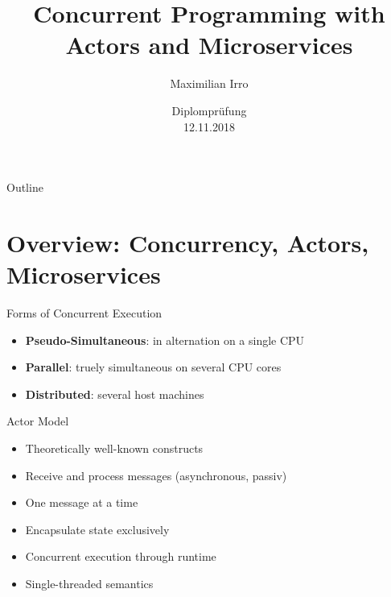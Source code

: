 \documentclass{beamer}
\title[Your Short Title]{Concurrent Programming with\\Actors and Microservices}
\author{Maximilian Irro}
\date{Diplomprüfung\\12.11.2018}
\begin{document}
\begin{frame}
  \titlepage
\end{frame}

\begin{frame}{Outline}
  \tableofcontents
\end{frame}


\section{Overview: Concurrency, Actors, Microservices}


\begin{frame}{Forms of Concurrent Execution}

\begin{itemize}
  \item \textbf{Pseudo-Simultaneous}: in alternation on a single CPU
  \item \textbf{Parallel}: truely simultaneous on several CPU cores
  \item \textbf{Distributed}: several host machines
\end{itemize}

\end{frame}


\begin{frame}{Actor Model}

\begin{itemize}
  \item Theoretically well-known constructs
  \item Receive and process messages (asynchronous, passiv)
  \item One message at a time
  \item Encapsulate state exclusively
  \item Concurrent execution through runtime
  \item Single-threaded semantics
\end{itemize}

\end{frame}

\end{document}
